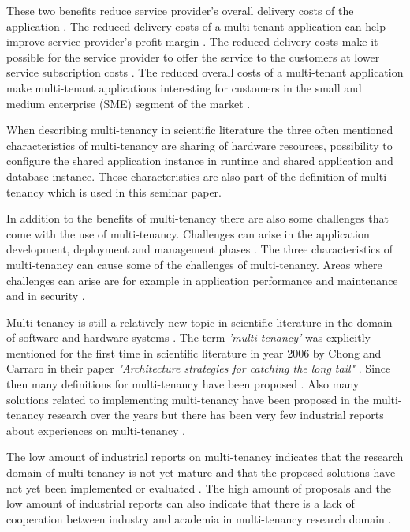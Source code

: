 \documentclass[conference]{sasmoota2017}
\begin{document}
These two benefits reduce service provider's overall delivery costs of the application \cite{Bezemer:2010:MaintenanceDream}. The reduced delivery costs of a multi-tenant application can help improve service provider's profit margin \cite{Guo:2007:FrameworkForNative}. The reduced delivery costs make it possible for the service provider to offer the service to the customers at lower service subscription costs \cite{Guo:2007:FrameworkForNative}. The reduced overall costs of a multi-tenant application make multi-tenant applications interesting for customers in the small and medium enterprise (SME) segment of the market \cite{Bezemer:2010:MaintenanceDream}.

When describing multi-tenancy in scientific literature the three often mentioned characteristics of multi-tenancy are sharing of hardware resources, possibility to configure the shared application instance in runtime and shared application and database instance. Those characteristics are also part of the definition of multi-tenancy which is used in this seminar paper. 

In addition to the benefits of multi-tenancy there are also some challenges that come with the use of multi-tenancy. Challenges can arise in the application development, deployment and management phases \cite{Guo:2007:FrameworkForNative}. The three characteristics of multi-tenancy can cause some of the challenges of multi-tenancy. Areas where challenges can arise are for example in application performance and maintenance and in security \cite{Bezemer:2010:MaintenanceDream}. 

Multi-tenancy is still a relatively new topic in scientific literature in the domain of software and hardware systems \cite{Kabbedijk2015:Defining}. The term \textit{'multi-tenancy'} was explicitly mentioned for the first time in scientific literature in year 2006 \cite{Kabbedijk2015:Defining} by Chong and Carraro in their paper \textit{"Architecture strategies for catching the long tail"} \cite{Carraro:2006:ArchitectureLongTail}. Since then many definitions for multi-tenancy have been proposed \cite{Kabbedijk2015:Defining}. Also many solutions related to implementing multi-tenancy have been proposed in the multi-tenancy research over the years but there has been very few industrial reports about experiences on multi-tenancy \cite{Kabbedijk2015:Defining}. 

The low amount of industrial reports on multi-tenancy indicates that the research domain of multi-tenancy is not yet mature and that the proposed solutions have not yet been implemented or evaluated \cite{Kabbedijk2015:Defining}. The high amount of proposals and the low amount of industrial reports can also indicate that there is a lack of cooperation between industry and academia in multi-tenancy research domain \cite{Kabbedijk2015:Defining}.
\end{document}
